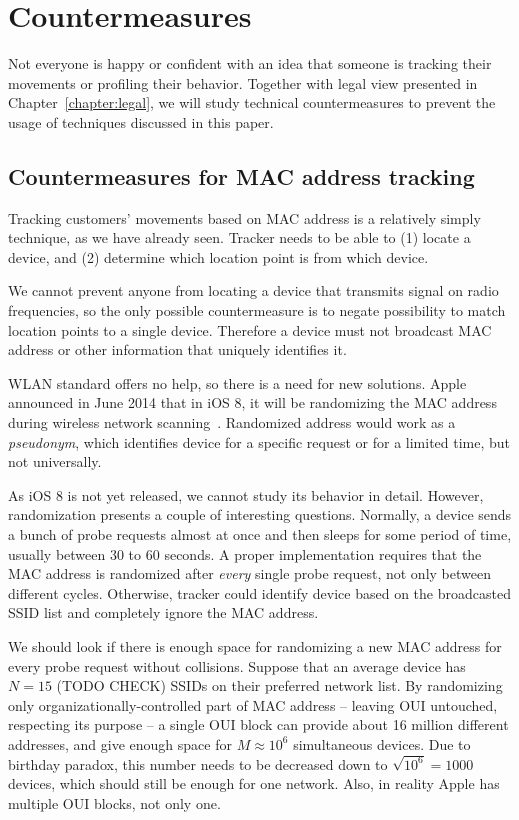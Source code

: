 \documentclass[12pt,a4paper,oneside,pdftex]{report}
\begin{document}


\chapter{Countermeasures}
\label{chapter:countermeasures}

Not everyone is happy or confident with an idea that someone is tracking their movements or profiling their behavior. Together with legal view presented in Chapter~\ref{chapter:legal}, we will study technical countermeasures to prevent the usage of techniques discussed in this paper. 

\section{Countermeasures for MAC address tracking}

Tracking customers' movements based on MAC address is a relatively simply technique, as we have already seen. Tracker needs to be able to (1) locate a device, and (2) determine which location point is from which device. 

We cannot prevent anyone from locating a device that transmits signal on radio frequencies, so the only possible countermeasure is to negate possibility to match location points to a single device. Therefore a device must not broadcast MAC address or other information that uniquely identifies it.

WLAN standard offers no help, so there is a need for new solutions. Apple announced in June 2014 that in iOS 8, it will be randomizing the MAC address during wireless network scanning~\cite{FredericJacobs2014,apple_wwdc_privacy}. Randomized address would work as a \emph{pseudonym}, which identifies device for a specific request or for a limited time, but not universally.

As iOS 8 is not yet released, we cannot study its behavior in detail. However, randomization presents a couple of interesting questions. Normally, a device sends a bunch of probe requests almost at once and then sleeps for some period of time, usually between 30 to 60 seconds. A proper implementation requires that the MAC address is randomized after \emph{every} single probe request, not only between different cycles. Otherwise, tracker could identify device based on the broadcasted SSID list and completely ignore the MAC address.

We should look if there is enough space for randomizing a new MAC address for every probe request without collisions. Suppose that an average device has $N = 15$ (TODO CHECK) SSIDs on their preferred network list. By randomizing only organizationally-controlled part of MAC address -- leaving OUI untouched, respecting its purpose -- a single OUI block can provide about 16 million different addresses, and give enough space for $M \approx 10^6$ simultaneous devices. Due to birthday paradox, this number needs to be decreased down to $\sqrt{10^6} = 1000$ devices, which should still be enough for one network. Also, in reality Apple has multiple OUI blocks, not only one.
\end{document}
